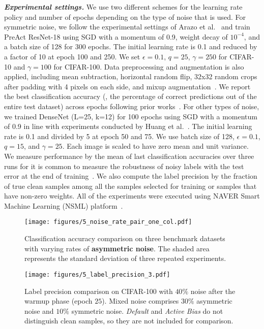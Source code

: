 \noindent\emph{\textbf{Experimental settings.}}
We use two different schemes for the learning rate policy and number of epochs depending on the type of noise that is used. For symmetric noise, we follow the experimental settings of Arazo et al.~\cite{arazo2019unsupervised} and train PreAct ResNet-18 using SGD with a momentum of 0.9, weight decay of $10^{-4}$, and a batch size of 128 for 300 epochs. The initial learning rate is 0.1 and reduced by a factor of 10 at epoch 100 and 250. We set $\epsilon=0.1$, $q=25$, $\gamma=250$ for CIFAR-10 and $\gamma=100$ for CIFAR-100. Data preprocessing and augmentation is also applied, including mean subtraction, horizontal random flip, 32x32 random crops after padding with 4 pixels on each side, and mixup augmentation~\cite{zhang2018mixup}. We report the best classification accuracy (\ie, the percentage of correct predictions out of the entire test dataset) across epochs following prior works~\cite{seo2019combinatorial, arazo2019unsupervised}. For other types of noise, we trained DenseNet (L=25, k=12) for 100 epochs using SGD with a momentum of 0.9 in line with experiments conducted by Huang et al.~\cite{huang2017densely}. The initial learning rate is 0.1 and divided by 5 at epoch 50 and 75. We use batch size of 128, $\epsilon=0.1$, $q=15$, and $\gamma=25$. Each image is scaled to have zero mean and unit variance. We measure performance by the mean of last classification accuracies over three runs for it is common to measure the robustness of noisy labels with the test error at the end of training~\cite{malach2017decoupling, song2019selfie}. We also compute the label precision by the fraction of true clean samples among all the samples selected for training or samples that have non-zero weights. All of the experiments were executed using NAVER Smart Machine Learning (NSML) platform~\cite{kim2018nsml,sung2017nsml}. 



\begin{figure}[t]
\centering
\texttt{[image: figures/5\_noise\_rate\_pair\_one\_col.pdf]} 
\caption{Classification accuracy comparison on three benchmark datasets with varying rates of \textbf{asymmetric noise}. The shaded area represents the standard deviation of three repeated experiments.
\label{fig:asymmetric_noise_rate}}
\vspace{0.2em}
\end{figure}


\begin{figure}[t]
\centering
\texttt{[image: figures/5\_label\_precision\_3.pdf]} 
\caption{Label precision comparison on CIFAR-100 with $40\%$ noise after the warmup phase (epoch $25$). Mixed noise comprises $30\%$ asymmetric noise and $10\%$ symmetric noise. \textit{Default} and \textit{Active Bias} do not distinguish clean samples, so they are not included for comparison.
}
\label{fig:precision}
\end{figure}



